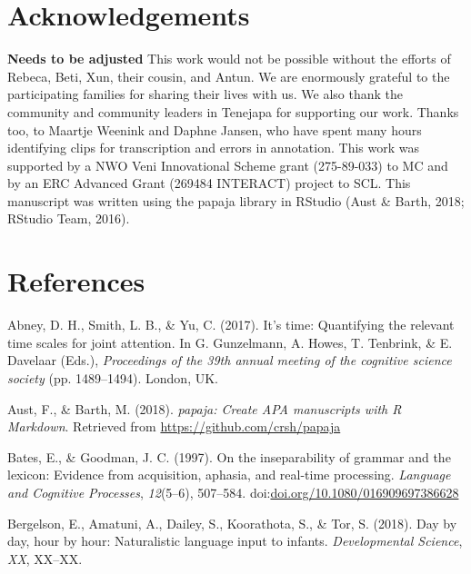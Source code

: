 \documentclass[floatsintext,man]{apa6}
\theoremstyle{definition}
\theoremstyle{definition}
\theoremstyle{definition}
\theoremstyle{remark}
\begin{document}
\section{Acknowledgements}\label{acknowledgements}

\textbf{Needs to be adjusted} This work would not be possible without
the efforts of Rebeca, Beti, Xun, their cousin, and Antun. We are
enormously grateful to the participating families for sharing their
lives with us. We also thank the community and community leaders in
Tenejapa for supporting our work. Thanks too, to Maartje Weenink and
Daphne Jansen, who have spent many hours identifying clips for
transcription and errors in annotation. This work was supported by a NWO
Veni Innovational Scheme grant (275-89-033) to MC and by an ERC Advanced
Grant (269484 INTERACT) project to SCL. This manuscript was written
using the papaja library in RStudio (Aust \& Barth, 2018; RStudio Team,
2016).

\newpage

\section{References}\label{refs}

\begingroup
\setlength{\parindent}{-0.5in} \setlength{\leftskip}{0.5in}

\hypertarget{refs}{}
\hypertarget{ref-abney2017time}{}
Abney, D. H., Smith, L. B., \& Yu, C. (2017). It's time: Quantifying the
relevant time scales for joint attention. In G. Gunzelmann, A. Howes, T.
Tenbrink, \& E. Davelaar (Eds.), \emph{Proceedings of the 39th annual
meeting of the cognitive science society} (pp. 1489--1494). London, UK.

\hypertarget{ref-R-papaja}{}
Aust, F., \& Barth, M. (2018). \emph{papaja: Create APA manuscripts with
R Markdown}. Retrieved from \url{https://github.com/crsh/papaja}

\hypertarget{ref-bates1997inseparability}{}
Bates, E., \& Goodman, J. C. (1997). On the inseparability of grammar
and the lexicon: Evidence from acquisition, aphasia, and real-time
processing. \emph{Language and Cognitive Processes}, \emph{12}(5--6),
507--584.
doi:\href{https://doi.org/doi.org/10.1080/016909697386628}{doi.org/10.1080/016909697386628}

\hypertarget{ref-bergelson2018day}{}
Bergelson, E., Amatuni, A., Dailey, S., Koorathota, S., \& Tor, S.
(2018). Day by day, hour by hour: Naturalistic language input to
infants. \emph{Developmental Science}, \emph{XX}, XX--XX.
\end{document}
